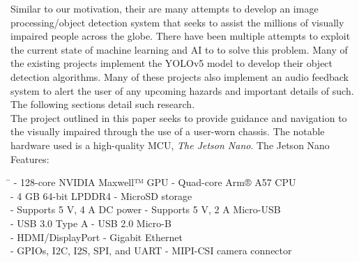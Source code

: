 \noindent Similar to our motivation, their are many attempts to develop an image processing/object detection system that seeks to assist the millions of visually impaired people across the globe. There have been multiple attempts to exploit the current state of machine learning and AI to to solve this problem. Many of the existing projects implement the YOLOv5 model to develop their object detection algorithms. Many of these projects also implement an audio feedback system to alert the user of any upcoming hazards and important details of such. The following sections detail such research. \\                                                                                                                                                                                                                                                                                                                                                                                                                                                                                                                                                                                                                                                                                                                                                                                                                                                                                                                                                                                                                                                                                                                                                                                                                                                 

\noindent The project outlined in this paper \cite{CVRef1} seeks to provide guidance and navigation to the visually impaired through the use of a user-worn chassis. The notable hardware used is a high-quality MCU, \textit{The Jetson Nano}. The Jetson Nano Features: 
\begin{tabbing}
	\hspace{8cm} \= \kill %
	- 128-core NVIDIA Maxwell™ GPU  \> - Quad-core Arm® A57 CPU \\
	- 4 GB 64-bit LPDDR4            \> 	- MicroSD storage \\
	- Supports 5 V, 4 A DC power     \> - Supports 5 V, 2 A Micro-USB \\
	- USB 3.0 Type A                \> - USB 2.0 Micro-B \\
	- HDMI/DisplayPort              \> - Gigabit Ethernet \\
	- GPIOs, I2C, I2S, SPI, and UART \> - MIPI-CSI camera connector \\
\end{tabbing}

